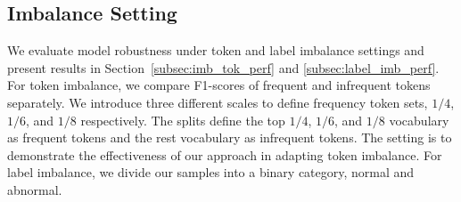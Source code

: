 \documentclass[sn-mathphys-num]{sn-jnl}%
\theoremstyle{thmstyleone}%
\theoremstyle{thmstyletwo}%
\theoremstyle{thmstylethree}%
\begin{document}


\subsection{Imbalance Setting}
\label{subsec:im_sec}
We evaluate model robustness under token and label imbalance settings and present results in Section~\ref{subsec:imb_tok_perf} and \ref{subsec:label_imb_perf}. 
For token imbalance, we compare F1-scores of frequent and infrequent tokens separately. 
We introduce three different scales to define frequency token sets, $1/4$, $1/6$, and $1/8$ respectively.
The splits define the top $1/4$, $1/6$, and $1/8$ vocabulary as frequent tokens and the rest vocabulary as infrequent tokens. 
The setting is to demonstrate the effectiveness of our approach in adapting token imbalance. 
For label imbalance, we divide our samples into a binary category, normal and abnormal. 
\end{document}
